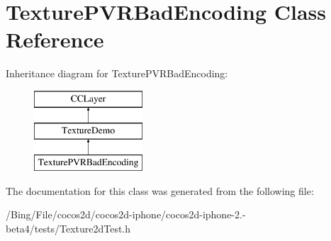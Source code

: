 \hypertarget{interface_texture_p_v_r_bad_encoding}{\section{Texture\-P\-V\-R\-Bad\-Encoding Class Reference}
\label{interface_texture_p_v_r_bad_encoding}
}
Inheritance diagram for Texture\-P\-V\-R\-Bad\-Encoding\-:\begin{figure}[H]
\begin{center}
\leavevmode
\includegraphics[height=3.000000cm]{interface_texture_p_v_r_bad_encoding}
\end{center}
\end{figure}


The documentation for this class was generated from the following file\-:\begin{DoxyCompactItemize}
\item 
/\-Bing/\-File/cocos2d/cocos2d-\/iphone/cocos2d-\/iphone-\/2.-\/beta4/tests/Texture2d\-Test.\-h\end{DoxyCompactItemize}
